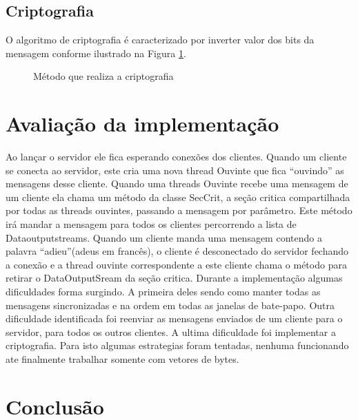 \documentclass[a4paper,12pt]{article}
\begin{document}
\subsection{Criptografia}
O algoritmo de criptografia é caracterizado por inverter valor dos bits da mensagem conforme ilustrado na Figura \ref{fig9}.
\begin{figure}[H]

\caption{Método que realiza a criptografia}
\label{fig9}
\end{figure}


\section{Avaliação da implementação}
Ao lançar o servidor ele fica esperando conexões dos clientes. Quando um cliente se conecta ao servidor, este cria uma nova thread Ouvinte que fica “ouvindo” as mensagens desse cliente. 
Quando uma threads Ouvinte recebe uma mensagem de um cliente ela chama um método da classe SecCrit, a seção critica compartilhada por todas as threads ouvintes, passando a mensagem por parâmetro. Este método irá mandar a mensagem para todos os clientes percorrendo a lista de Dataoutputstreams.
Quando um cliente manda uma mensagem contendo a palavra “adieu”(adeus em francês), o cliente é desconectado do servidor fechando a conexão e a thread ouvinte correspondente a este cliente chama o método para retirar o DataOutputSream da seção critica.
Durante a implementação algumas dificuldades forma surgindo. A primeira deles sendo como manter todas as mensagens sincronizadas e na ordem em todas as janelas de bate-papo.
Outra dificuldade identificada foi reenviar as mensagens enviados de um cliente para o servidor, para todos os outros clientes.
A ultima dificuldade foi implementar a criptografia. Para isto algumas estrategias foram tentadas, nenhuma funcionando ate finalmente trabalhar somente com vetores de bytes.
\section{Conclusão}





\end{document}
